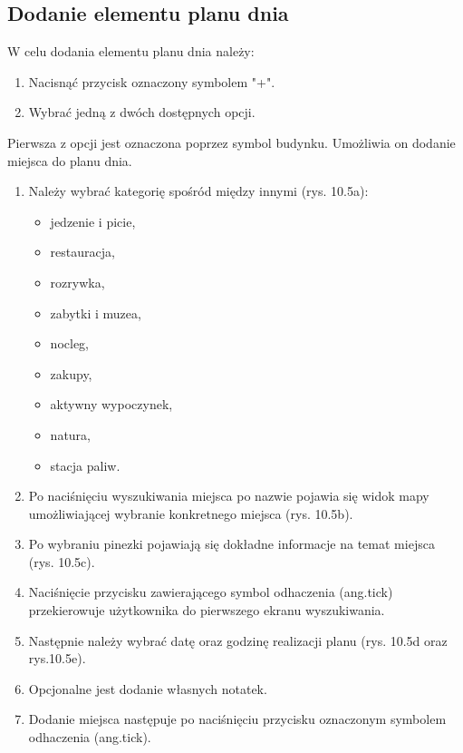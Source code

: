 \subsection{Dodanie elementu planu dnia}
W celu dodania elementu planu dnia należy:
\begin{enumerate}
\item Nacisnąć przycisk oznaczony symbolem "+".
\item Wybrać jedną z dwóch dostępnych opcji.
\end{enumerate}

\par Pierwsza z opcji jest oznaczona poprzez symbol budynku.
Umożliwia on dodanie miejsca do planu dnia.

\begin{enumerate}
\item Należy wybrać kategorię spośród między innymi (rys. 10.5a):
\begin{itemize}
\item jedzenie i picie,
\item restauracja,
\item rozrywka,
\item zabytki i muzea,
\item nocleg,
\item zakupy,
\item aktywny wypoczynek,
\item natura,
\item stacja paliw.
\end{itemize}
\item Po naciśnięciu wyszukiwania miejsca po nazwie pojawia się widok mapy umożliwiającej wybranie konkretnego miejsca (rys. 10.5b).
\item Po wybraniu pinezki pojawiają się dokładne informacje na temat miejsca (rys. 10.5c).
\item Naciśnięcie przycisku zawierającego symbol odhaczenia (ang.tick) przekierowuje użytkownika do pierwszego ekranu wyszukiwania.
\item Następnie należy wybrać datę oraz godzinę realizacji planu (rys. 10.5d oraz rys.10.5e).
\item Opcjonalne jest dodanie własnych notatek.
\item Dodanie miejsca następuje po naciśnięciu przycisku oznaczonym symbolem odhaczenia (ang.tick).
\end{enumerate}


